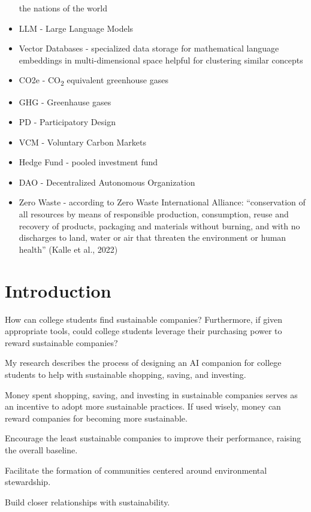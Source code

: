 \documentclass[
  letterpaper,
  DIV=11,
  numbers=noendperiod]{scrartcl}
\begin{document}
\begin{itemize}
  the nations of the world
\item
  LLM - Large Language Models
\item
  Vector Databases - specialized data storage for mathematical language
  embeddings in multi-dimensional space helpful for clustering similar
  concepts
\item
  CO2e - CO\textsubscript{2} equivalent greenhouse gases
\item
  GHG - Greenhause gases
\item
  PD - Participatory Design
\item
  VCM - Voluntary Carbon Markets
\item
  Hedge Fund - pooled investment fund
\item
  DAO - Decentralized Autonomous Organization
\item
  Zero Waste - according to Zero Waste International Alliance:
  ``conservation of all resources by means of responsible production,
  consumption, reuse and recovery of products, packaging and materials
  without burning, and with no discharges to land, water or air that
  threaten the environment or human health'' (Kalle et al., 2022)
\end{itemize}

\newpage

\section{Introduction}\label{introduction}

How can college students find sustainable companies? Furthermore, if
given appropriate tools, could college students leverage their
purchasing power to reward sustainable companies?

My research describes the process of designing an AI companion for
college students to help with sustainable shopping, saving, and
investing.

Money spent shopping, saving, and investing in sustainable companies
serves as an incentive to adopt more sustainable practices. If used
wisely, money can reward companies for becoming more sustainable.

Encourage the least sustainable companies to improve their performance,
raising the overall baseline.

Facilitate the formation of communities centered around environmental
stewardship.

Build closer relationships with sustainability.
\end{document}
